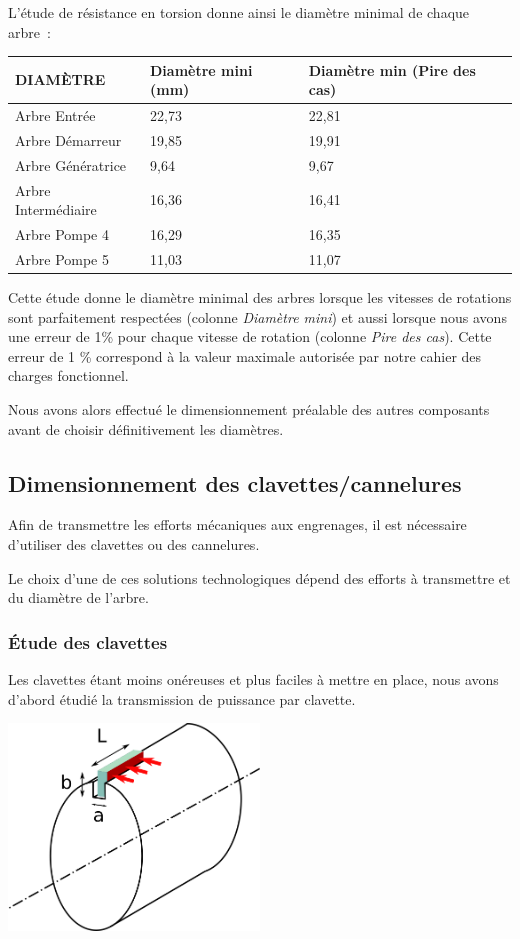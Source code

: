 \documentclass{config}
\begin{document}
\begin{spacing}{1.2}
L'étude de résistance en torsion donne ainsi le diamètre minimal de chaque arbre :

\begin{table}[h]
\centering
\begin{tabular}{|l|l|l|}
\hline
DIAMÈTRE & Diamètre mini (mm) & Diamètre min (Pire des cas) \\ \hline
Arbre Entrée & 22,73 & 22,81 \\ \hline
Arbre Démarreur & 19,85 & 19,91 \\ \hline
Arbre Génératrice & 9,64 & 9,67 \\ \hline
Arbre Intermédiaire & 16,36 & 16,41 \\ \hline
Arbre Pompe 4 & 16,29 & 16,35 \\ \hline
Arbre Pompe 5 & 11,03 & 11,07 \\ \hline
\end{tabular}
\end{table}

Cette étude donne le diamètre minimal des arbres lorsque les vitesses de rotations sont parfaitement respectées (colonne \textit{Diamètre mini}) et aussi lorsque nous avons une erreur de 1\% pour chaque vitesse de rotation (colonne \textit{Pire des cas}). Cette erreur de 1 \% correspond à la valeur maximale autorisée par notre cahier des charges fonctionnel.

Nous avons alors effectué le dimensionnement préalable des autres composants avant de choisir définitivement les diamètres.

\newpage
\subsection{Dimensionnement des clavettes/cannelures}
Afin de transmettre les efforts mécaniques aux engrenages, il est nécessaire d'utiliser des clavettes ou des cannelures. 

Le choix d'une de ces solutions technologiques dépend des efforts à transmettre et du diamètre de l'arbre.

\subsubsection{Étude des clavettes}
Les clavettes étant moins onéreuses et plus faciles à mettre en place, nous avons d'abord étudié la transmission de puissance par clavette.
\begin{center}
\includegraphics[width=0.5\textwidth]{Determination_clavette_sur_arbre.png}
\end{center}


\end{spacing}
\end{document}
